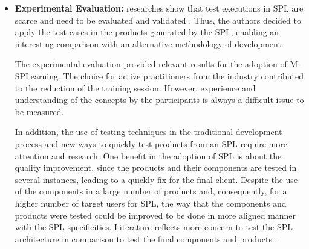 \begin{itemize}
\item \textbf{Experimental Evaluation:} researches show that test executions in SPL are scarce and need to be evaluated and validated \cite{engstrom11}. Thus, the authors decided to apply the test cases in the products generated by the SPL, enabling an interesting comparison with an alternative methodology of development.

The experimental evaluation provided relevant results for the adoption of M-SPLear\allowbreak ning. The choice for active practitioners from the industry contributed to the reduction of the training session. However, experience and understanding of the concepts by the participants is always a difficult issue to be measured.

In addition, the use of testing techniques in the traditional development process and new ways to quickly test products from an SPL require more attention and research. One benefit in the adoption of SPL is about the quality improvement, since the products and their components are tested in several instances, leading to a quickly fix for the final client. Despite the use of the components in a large number of products and, consequently, for a higher number of target users for SPL, the way that the components and products were tested could be improved to be done in more aligned manner with the SPL specificities. Literature reflects more concern to test the SPL architecture in comparison to test the final components and products \cite{machado2014,net2011}.
\end{itemize}